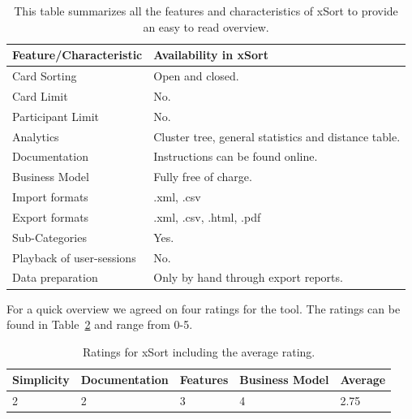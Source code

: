 \begin{table}[t]
\centering
\begin{tabularx}
{\linewidth}{|l|X|}
\hline \textbf{Feature/Characteristic} & \textbf{Availability in xSort} \\ 
\hline Card Sorting & Open and closed. \\ 
\hline Card Limit & No. \\
\hline Participant Limit & No. \\
\hline Analytics & Cluster tree, general statistics and distance table. \\ 
\hline Documentation & Instructions can be found online. \\
\hline Business Model & Fully free of charge. \\
\hline Import formats & .xml, .csv \\ 
\hline Export formats & .xml, .csv, .html, .pdf \\ 
\hline Sub-Categories & Yes. \\ 
\hline Playback of user-sessions & No. \\ 
\hline Data preparation & Only by hand through export reports. \\ 
\hline
\end{tabularx} 
\caption[Feature summary of xSort] 
{ 
This table summarizes all the features and characteristics of xSort
to provide an easy to read overview.
}
\label{tab:features-xSort}
\end{table}

For a quick overview we agreed on four ratings for the tool. The ratings can be
found in Table~\ref{tab:rating-xSort} and range from 0-5.

\begin{table}[h] 
\centering 
\begin{tabularx}{\linewidth}{|X|X|X|X|X|}
\hline
Simplicity & Documentation & Features & Business Model & Average \\ 
\hline 
2 & 2 & 3 & 4 & 2.75 \\ 
\hline 
\end{tabularx} 
\caption[Ratings for xSort] {
Ratings for xSort including the average rating.
} 
\label{tab:rating-xSort}
\end{table}